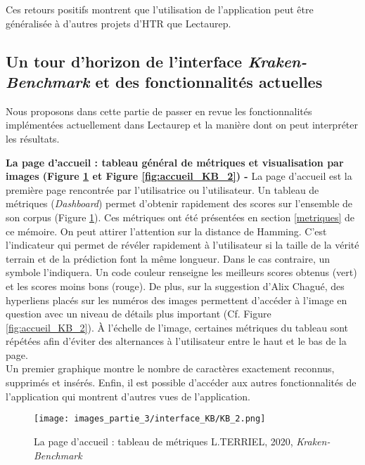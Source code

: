 Ces retours positifs montrent que l'utilisation de l'application peut être généralisée à d'autres projets d'HTR que Lectaurep.\\
\newpage
\subsection{Un tour d'horizon de l'interface \textit{Kraken-Benchmark} et des fonctionnalités actuelles}\label{inter_fonc}
Nous proposons dans cette partie de passer en revue les fonctionnalités implémentées actuellement dans Lectaurep et la manière dont on peut interpréter les résultats.

\textbf{La page d'accueil : tableau général de métriques et visualisation par images (Figure \ref{fig:accueil_KB_1} et Figure \ref{fig:accueil_KB_2}) - } La page d'accueil est la première page rencontrée par l'utilisatrice ou l'utilisateur. Un tableau de métriques (\textit{Dashboard}) permet d'obtenir rapidement des scores sur l'ensemble de son corpus (Figure \ref{fig:accueil_KB_1}). Ces métriques ont été présentées en section \ref{metriques} de ce mémoire. On peut attirer l'attention sur la distance de Hamming. C'est l'indicateur qui permet de révéler rapidement à l'utilisateur si la taille de la vérité terrain et de la prédiction font la même longueur. Dans le cas contraire, un symbole \inquote{$\emptyset$} l'indiquera. Un code couleur renseigne les meilleurs scores obtenus (vert) et les scores moins bons (rouge). De plus, sur la suggestion d'Alix Chagué, des hyperliens placés sur les numéros des images permettent d'accéder à l'image en question avec un niveau de détails plus important (Cf. Figure \ref{fig:accueil_KB_2}). 
À l'échelle de l'image, certaines métriques du tableau sont répétées afin d'éviter des alternances à l'utilisateur entre le haut et le bas de la page.\\ Un premier graphique montre le nombre de caractères exactement reconnus, supprimés et insérés. Enfin, il est possible d'accéder aux autres fonctionnalités de l'application qui montrent d'autres vues de l'application.
\begin{figure}[H]
    \centering
    \texttt{[image: images\_partie\_3/interface\_KB/KB\_2.png]}
        \caption{La page d'accueil : tableau de métriques \textcopyright L.TERRIEL, 2020, \textit{Kraken-Benchmark}}
        \label{fig:accueil_KB_1}
\end{figure}

